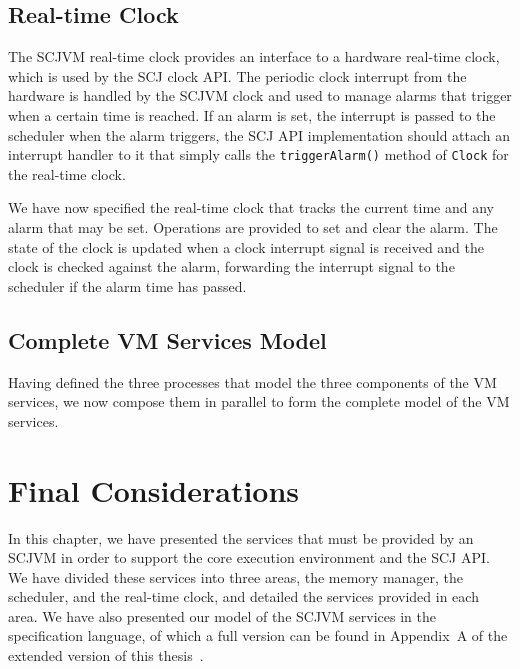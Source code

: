 \subsection{Real-time Clock}
\label{realtime-clock-model-section}

The SCJVM real-time clock provides an interface to a hardware
real-time clock, which is used by the SCJ clock API. 
The periodic clock interrupt from the hardware is handled by the SCJVM
clock and used to manage alarms that trigger when a certain time is
reached. 
If an alarm is set, the interrupt is passed to the scheduler when the
alarm triggers, the SCJ API implementation should attach an interrupt
handler to it that simply calls the \texttt{triggerAlarm()} method of
\texttt{Clock} for the real-time clock. 



We have now specified the real-time clock that tracks the current time
and any alarm that may be set.
Operations are provided to set and clear the alarm.
The state of the clock is updated when a clock interrupt signal is
received and the clock is checked against the alarm, forwarding the
interrupt signal to the scheduler if the alarm time has passed.

\subsection{Complete VM Services Model}
\label{scjvm-services-section}

Having defined the three processes that model the three components of
the VM services, we now compose them in parallel to form the complete
model of the VM services.



\section{Final Considerations}

In this chapter, we have presented the services that must be provided
by an SCJVM in order to support the core execution environment and the
SCJ API.
We have divided these services into three areas, the memory manager,
the scheduler, and the real-time clock, and detailed the services
provided in each area.
We have also presented our model of the SCJVM services in the
\Circus{} specification language, of which a full version can be found
in Appendix~A of the extended version of this
thesis~\cite{baxter2018-extended}.

